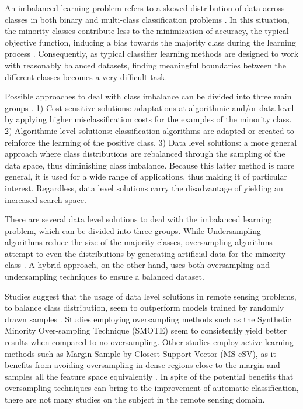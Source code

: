 \documentclass[parskip=full]{scrartcl}
\begin{document}
An imbalanced learning problem refers to a skewed distribution of data across
classes in both binary and multi-class classification problems \cite{Abdi2016}.
In this situation, the minority classes contribute less to the minimization of
accuracy, the typical objective function, inducing a bias towards the majority
class during the learning process \cite{Douzas2019}. Consequently, as typical
classifier learning methods are designed to work with reasonably balanced
datasets, finding meaningful boundaries between the different classes becomes a
very difficult task\cite{Saez2016}.

Possible approaches to deal with class imbalance can be divided into three main
groups \cite{Fernandez2013}. 1) Cost-sensitive solutions: adaptations at
algorithmic and/or data level by applying higher misclassification costs for the
examples of the minority class. 2) Algorithmic level solutions: classification
algorithms are adapted or created to reinforce the learning of the positive
class. 3) Data level solutions: a more general approach where class
distributions are rebalanced through the sampling of the data space, thus
diminishing class imbalance. Because this latter method is more general, it is
used for a wide range of applications, thus making it of particular interest.
Regardless, data level solutions carry the disadvantage of yielding an increased
search space.

There are several data level solutions to deal with the imbalanced learning
problem, which can be divided into three groups. While Undersampling algorithms
reduce the size of the majority classes, oversampling algorithms attempt to
even the distributions by generating artificial data for the minority class
\cite{Mellor2015}. A hybrid approach, on the other hand, uses both oversampling
and undersampling techniques to ensure a balanced dataset.

Studies suggest that the usage of data level solutions in remote sensing
problems, to balance class distribution, seem to outperform models
trained by randomly drawn samples \cite{Wang2019, Mellor2015}.  Studies
employing oversampling methods such as the Synthetic Minority Over-sampling
Technique (SMOTE) \cite{Chawla2002} seem to consistently yield better results
\cite{Johnson2013, Geib2015} when compared to no oversampling. Other studies
employ active learning methods such as Margin Sample by Closest Support Vector
(MS-cSV), as it benefits from avoiding oversampling in dense regions close to
the margin and samples all the feature space equivalently \cite{Tuia2009}.
In spite of the potential benefits that oversampling techniques can bring to
the improvement of automatic classification, there are not many studies on the
subject in the remote sensing domain.
\end{document}
